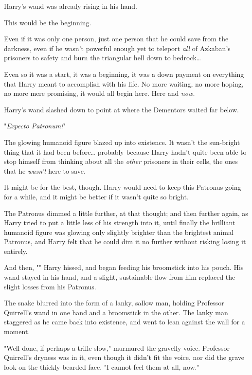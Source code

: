 Harry's wand was already rising in his hand.

This would be the beginning.

Even if it was only one person, just one person that he could save from the 
darkness, even if he wasn't powerful enough yet to teleport \emph{all} of 
Azkaban's prisoners to safety and burn the triangular hell down to 
bedrock{\ldots}

Even so it was a start, it was a beginning, it was a down payment on everything 
that Harry meant to accomplish with his life. No more waiting, no more hoping, 
no more mere promising, it would all begin here. Here and \emph{now.}

Harry's wand slashed down to point at where the Dementors waited far below.

"\emph{Expecto Patronum!}"

The glowing humanoid figure blazed up into existence. It wasn't the sun-bright 
thing that it had been before{\ldots} probably because Harry hadn't quite been 
able to stop himself from thinking about all the \emph{other} prisoners in 
their cells, the ones that he \emph{wasn't} here to save.

It might be for the best, though. Harry would need to keep this Patronus going 
for a while, and it might be better if it wasn't quite so bright.

The Patronus dimmed a little further, at that thought; and then further again, 
as Harry tried to put a little less of his strength into it, until finally the 
brilliant humanoid figure was glowing only slightly brighter than the brightest 
animal Patronus, and Harry felt that he could dim it no further without risking 
losing it entirely.

And then, "" Harry hissed, and began feeding his 
broomstick into his pouch. His wand stayed in his hand, and a slight, 
sustainable flow from him replaced the slight losses from his Patronus.

The snake blurred into the form of a lanky, sallow man, holding Professor 
Quirrell's wand in one hand and a broomstick in the other. The lanky man 
staggered as he came back into existence, and went to lean against the wall for 
a moment.

"Well done, if perhaps a trifle slow," murmured the gravelly voice. Professor 
Quirrell's dryness was in it, even though it didn't fit the voice, nor did the 
grave look on the thickly bearded face. "I cannot feel them at all, now."

